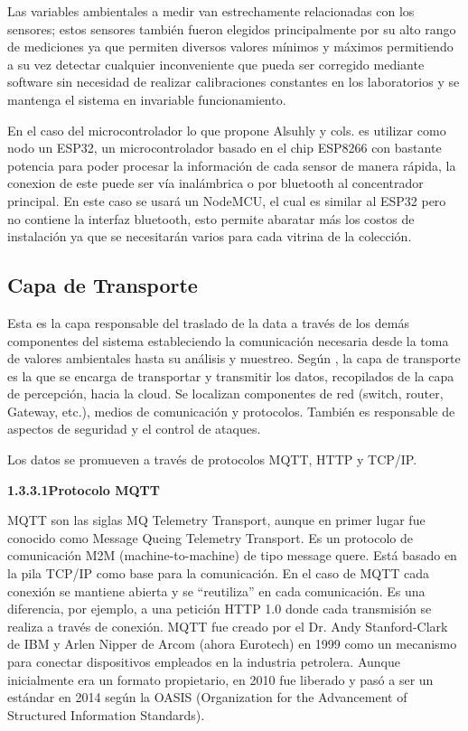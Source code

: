    Las variables ambientales a medir van estrechamente relacionadas con los sensores; estos sensores también fueron elegidos principalmente por su alto rango de mediciones ya que permiten diversos valores mínimos 
    y máximos permitiendo a su vez detectar cualquier inconveniente que pueda ser corregido mediante software sin necesidad de realizar calibraciones constantes en los laboratorios y se mantenga el sistema en invariable funcionamiento. 

    En el caso del microcontrolador lo que propone Alsuhly y cols.\cite{alsuhly} es utilizar como nodo un ESP32, un microcontrolador basado en el chip ESP8266 con bastante potencia para poder procesar la información de cada sensor de manera rápida,
    la conexion de este puede ser vía inalámbrica o por bluetooth al concentrador principal. En este caso se usará un NodeMCU, el cual es similar al ESP32 pero no contiene la interfaz bluetooth, esto permite abaratar más los costos de instalación ya que se necesitarán varios para cada vitrina de la colección.

    \subsection{Capa de Transporte}\label{subsec:capa_transporte}

    Esta es la capa responsable del traslado de la data a través de los demás componentes del sistema estableciendo la comunicación necesaria desde la toma de valores ambientales hasta su análisis y muestreo.    
    Según \cite{internetOfThingsStateOfTheArt}, la capa de transporte es la que se encarga de transportar y transmitir los datos, recopilados de la capa de percepción, hacia la cloud. Se localizan componentes de red (switch, router, Gateway, etc.), medios de comunicación y protocolos. También es responsable de aspectos de seguridad y el control de ataques.
    
    Los datos se promueven a través de protocolos MQTT, HTTP y TCP/IP.\\
    
        \textbf{1.3.3.1\hspace{5mm}Protocolo MQTT}

    MQTT son las siglas MQ Telemetry Transport, aunque en primer lugar fue conocido como Message Queing Telemetry Transport. Es un protocolo de comunicación M2M (machine-to-machine) de tipo message quere. Está basado en la pila TCP/IP como base para la comunicación. En el caso de MQTT cada conexión se mantiene abierta y se “reutiliza” en cada comunicación. Es una diferencia, por ejemplo, a una petición HTTP 1.0 donde cada transmisión se realiza a través de conexión.
    MQTT fue creado por el Dr. Andy Stanford-Clark de IBM y Arlen Nipper de Arcom (ahora Eurotech) en 1999 como un mecanismo para conectar dispositivos empleados en la industria petrolera.
    Aunque inicialmente era un formato propietario, en 2010 fue liberado y pasó a ser un estándar en 2014 según la OASIS (Organization for the Advancement of Structured Information Standards). \cite{mqtt}\\

